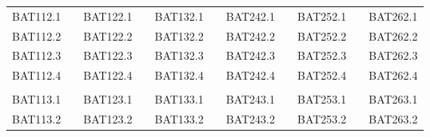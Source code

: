 \begin{figure}[h]
\begin{tabular}{lp{2mm}lp{2mm}lp{1.5cm}lp{2mm}lp{2mm}l}
\multicolumn{1}{|l|}{BAT112.1} & \multicolumn{1}{l|}{} & \multicolumn{1}{l|}{BAT122.1} & \multicolumn{1}{l|}{} & \multicolumn{1}{l|}{BAT132.1} & \multicolumn{1}{l|}{} & \multicolumn{1}{l|}{BAT242.1} & \multicolumn{1}{l|}{} & \multicolumn{1}{l|}{BAT252.1} & \multicolumn{1}{l|}{} & \multicolumn{1}{l|}{BAT262.1} \\ \cline{1-1} \cline{3-3} \cline{5-5} \cline{7-7} \cline{9-9} \cline{11-11} 
\multicolumn{1}{|l|}{BAT112.2} & \multicolumn{1}{l|}{} & \multicolumn{1}{l|}{BAT122.2} & \multicolumn{1}{l|}{} & \multicolumn{1}{l|}{BAT132.2} & \multicolumn{1}{l|}{} & \multicolumn{1}{l|}{BAT242.2} & \multicolumn{1}{l|}{} & \multicolumn{1}{l|}{BAT252.2} & \multicolumn{1}{l|}{} & \multicolumn{1}{l|}{BAT262.2} \\ \cline{1-1} \cline{3-3} \cline{5-5} \cline{7-7} \cline{9-9} \cline{11-11} 
\multicolumn{1}{|l|}{BAT112.3} & \multicolumn{1}{l|}{} & \multicolumn{1}{l|}{BAT122.3} & \multicolumn{1}{l|}{} & \multicolumn{1}{l|}{BAT132.3} & \multicolumn{1}{l|}{} & \multicolumn{1}{l|}{BAT242.3} & \multicolumn{1}{l|}{} & \multicolumn{1}{l|}{BAT252.3} & \multicolumn{1}{l|}{} & \multicolumn{1}{l|}{BAT262.3} \\ \cline{1-1} \cline{3-3} \cline{5-5} \cline{7-7} \cline{9-9} \cline{11-11} 
\multicolumn{1}{|l|}{BAT112.4} & \multicolumn{1}{l|}{} & \multicolumn{1}{l|}{BAT122.4} & \multicolumn{1}{l|}{} & \multicolumn{1}{l|}{BAT132.4} & \multicolumn{1}{l|}{} & \multicolumn{1}{l|}{BAT242.4} & \multicolumn{1}{l|}{} & \multicolumn{1}{l|}{BAT252.4} & \multicolumn{1}{l|}{} & \multicolumn{1}{l|}{BAT262.4} \\ \cline{1-1} \cline{3-3} \cline{5-5} \cline{7-7} \cline{9-9} \cline{11-11} 
                               &                       &                               &                       &                               &                       &                               &                       &                               &                       &                               \\ \cline{1-1} \cline{3-3} \cline{5-5} \cline{7-7} \cline{9-9} \cline{11-11} 
\multicolumn{1}{|l|}{BAT113.1} & \multicolumn{1}{l|}{} & \multicolumn{1}{l|}{BAT123.1} & \multicolumn{1}{l|}{} & \multicolumn{1}{l|}{BAT133.1} & \multicolumn{1}{l|}{} & \multicolumn{1}{l|}{BAT243.1} & \multicolumn{1}{l|}{} & \multicolumn{1}{l|}{BAT253.1} & \multicolumn{1}{l|}{} & \multicolumn{1}{l|}{BAT263.1} \\ \cline{1-1} \cline{3-3} \cline{5-5} \cline{7-7} \cline{9-9} \cline{11-11} 
\multicolumn{1}{|l|}{BAT113.2} & \multicolumn{1}{l|}{} & \multicolumn{1}{l|}{BAT123.2} & \multicolumn{1}{l|}{} & \multicolumn{1}{l|}{BAT133.2} & \multicolumn{1}{l|}{} & \multicolumn{1}{l|}{BAT243.2} & \multicolumn{1}{l|}{} & \multicolumn{1}{l|}{BAT253.2} & \multicolumn{1}{l|}{} & \multicolumn{1}{l|}{BAT263.2} \\ \cline{1-1} \cline{3-3} \cline{5-5} \cline{7-7} \cline{9-9} \cline{11-11} 

\end{tabular}
\end{figure}
